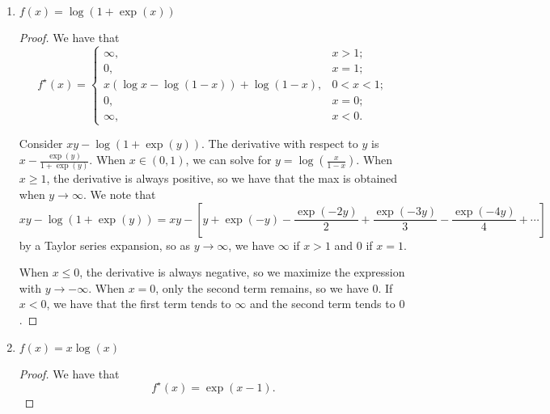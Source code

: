 \documentclass[11pt]{amsart}
\begin{document}
\begin{enumerate}
\begin{enumerate}
\begin{proof}
    To see this, we can maximize
    $\left\langle x, y \right\rangle - \exp\left(y\right)$ with respect to $y$
    by taking the derivative, setting it to $0$, and solving for $y$. In doing
    so, we find that $y = \log x$, which is only defined when $x > 0$. When
    $x \leq 0$, we see that we can maximize $xy - \exp\left(y\right)$ by sending
    $y$ to $-\infty$.
  \end{proof}
\item $f(x) =  \log(1+\exp(x))$
  \begin{proof}
    We have that
    \begin{equation*}
      \boxed{f^\star(x) =
        \begin{cases}
          \infty, &x > 1; \\
          0, &x = 1; \\
          x\left(\log x - \log\left(1 - x\right)\right)  + \log\left(1 - x\right), & 0 < x < 1; \\
          0, & x = 0; \\
          \infty, &x < 0.
        \end{cases}}
    \end{equation*}

    Consider $xy - \log(1+\exp(y))$. The derivative with respect to $y$ is
    $x - \frac{\exp(y)}{1+\exp(y)}$. When $x \in \left(0, 1\right)$, we can
    solve for $y = \log\left(\frac{x}{1 - x}\right)$. When $x \geq 1$, the
    derivative is always positive, so we have that the max is obtained when
    $y \rightarrow \infty$. We note that
    \begin{equation*}
      xy - \log(1+\exp(y)) = xy - \left[
        y + \exp(-y) - \frac{\exp(-2y)}{2} + \frac{\exp(-3y)}{3} - \frac{\exp(-4y)}{4} + \cdots
      \right]
    \end{equation*}
    by a Taylor series expansion, so as $y \rightarrow \infty$, we have $\infty$
    if $x > 1$ and $0$ if $x = 1$.

    When $x \leq 0$, the derivative is always negative, so we maximize the
    expression with $y \rightarrow -\infty$. When $x = 0$, only the second term
    remains, so we have $0$. If $x < 0$, we have that the first term tends to
    $\infty$ and the second term tends to $0$.
  \end{proof}
\item $f(x) = x\log(x)$
  \begin{proof}
    We have that
    \begin{equation*}
      \boxed{f^\star(x) = \exp\left(x - 1\right).}
    \end{equation*}


\end{proof}
\end{enumerate}
\end{enumerate}
\end{document}
